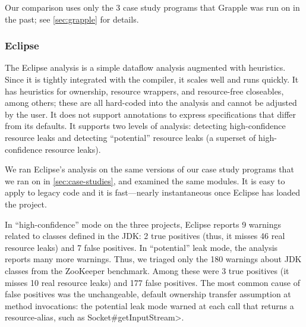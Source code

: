 
Our comparison uses only the 3 case study programs that Grapple was run on
in the past; see \cref{sec:grapple} for details.




\subsubsection{Eclipse}
\label{sec:eclipse}

The Eclipse analysis is a simple dataflow analysis
augmented with heuristics. Since it is tightly integrated with
the compiler, it scales well and runs quickly. It has
heuristics for ownership, resource wrappers, and resource-free
closeables, among others; these are all hard-coded into the analysis and cannot
be adjusted by the user. It does not support annotations to express
specifications that differ from its defaults.
It supports two levels of analysis: detecting high-confidence resource
leaks and detecting ``potential'' resource
leaks (a superset of high-confidence resource leaks).

We ran Eclipse's analysis on the same versions of our case study programs
that we ran \tool on in \cref{sec:case-studies}, and examined
the same modules. It is easy to apply
to legacy code and it is fast---nearly instantaneous once Eclipse
has loaded the project.

In ``high-confidence'' mode on the three projects, Eclipse reports 9
warnings related to classes defined in the JDK:
2 true positives (thus, it misses 46 real resource leaks) and 7
false positives.
In ``potential'' leak mode, the analysis reports many more warnings.
Thus, we triaged only the 180
warnings about JDK classes from the ZooKeeper benchmark.
Among these were 3 true positives (it misses 10 real resource leaks) and 177 false
positives.
The most common cause of false
positives was the unchangeable, default ownership transfer assumption
at method invocations:
the potential leak mode warned at each call that returns a resource-alias, such as
\<Socket\#getInputStream>.


